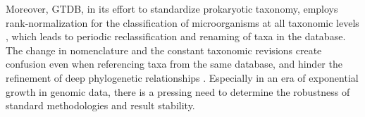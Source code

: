 Moreover, GTDB, in its effort to standardize prokaryotic taxonomy, employs rank-normalization for the classification of microorganisms at all taxonomic levels \cite{parks2018}, which leads to periodic reclassification and renaming of taxa in the database. The change in nomenclature and the constant taxonomic revisions create confusion even when referencing taxa from the same database, and hinder the refinement of deep phylogenetic relationships \cite{tahon2021}. Especially in an era of exponential growth in genomic data, there is a pressing need to determine the robustness of standard methodologies and result stability. 